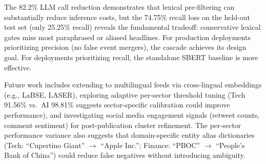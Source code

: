 \documentclass[conference]{IEEEtran}
\begin{document}
The 82.2\% LLM call reduction demonstrates that lexical pre-filtering can substantially reduce inference costs, but the 74.75\% recall loss on the held-out test set (only 25.25\% recall) reveals the fundamental tradeoff: conservative lexical gates miss most paraphrased or aliased headlines.
For production deployments prioritizing precision (no false event mergers), the cascade achieves its design goal.
For deployments prioritizing recall, the standalone SBERT baseline is more effective.

Future work includes extending to multilingual feeds via cross-lingual embeddings (e.g., LaBSE, LASER), exploring adaptive per-sector threshold tuning (Tech 91.56\% vs.\ AI 98.81\% suggests sector-specific calibration could improve performance), and investigating social media engagement signals (retweet counts, comment sentiment) for post-publication cluster refinement.
The per-sector performance variance also suggests that domain-specific entity alias dictionaries (Tech: ``Cupertino Giant'' $\to$ ``Apple Inc.''; Finance: ``PBOC'' $\to$ ``People's Bank of China'') could reduce false negatives without introducing ambiguity.
\end{document}
